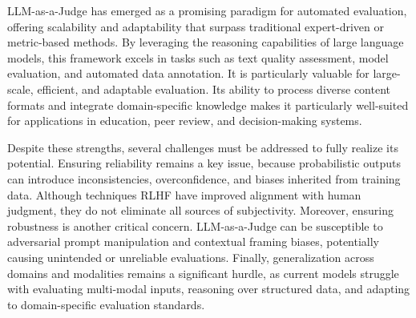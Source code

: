 LLM-as-a-Judge has emerged as a promising paradigm for automated evaluation, offering scalability and adaptability that surpass traditional expert-driven or metric-based methods. By leveraging the reasoning capabilities of large language models, this framework excels in tasks such as text quality assessment, model evaluation, and automated data annotation. It is particularly valuable for large-scale, efficient, and adaptable evaluation. Its ability to process diverse content formats and integrate domain-specific knowledge makes it particularly well-suited for applications in education, peer review, and decision-making systems.

Despite these strengths, several challenges must be addressed to fully realize its potential. Ensuring reliability remains a key issue, because probabilistic outputs can introduce inconsistencies, overconfidence, and biases inherited from training data. Although techniques RLHF have improved alignment with human judgment, they do not eliminate all sources of subjectivity. Moreover, ensuring robustness is another critical concern. LLM-as-a-Judge can be susceptible to adversarial prompt manipulation and contextual framing biases, potentially causing unintended or unreliable evaluations. Finally, generalization across domains and modalities remains a significant hurdle, as current models struggle with evaluating multi-modal inputs, reasoning over structured data, and adapting to domain-specific evaluation standards.



